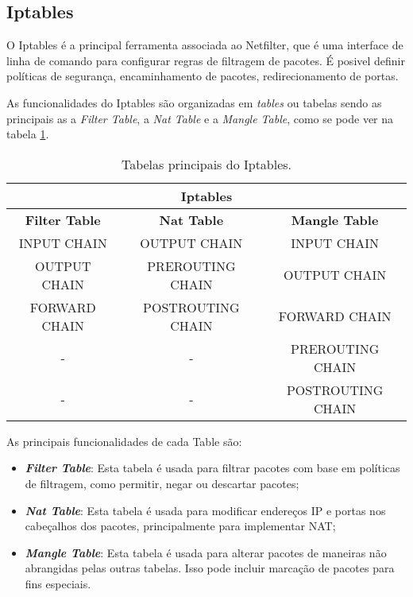 \subsection{Iptables}

O Iptables é a principal ferramenta associada ao Netfilter, que é uma interface
de linha de comando para configurar regras de filtragem de pacotes.
É posivel definir políticas de segurança, encaminhamento de pacotes,
redirecionamento de portas. 

As funcionalidades do Iptables são organizadas em \textit{tables} ou tabelas
sendo as principais as a \textit{Filter Table}, a \textit{Nat Table} e a
\textit{Mangle Table}, como se pode ver na tabela \ref{ipt1}.

\begin{table}[h]
\centering
\begin{tabular}{|c|c|c|}
\hline
\multicolumn{3}{|c|}{Iptables}\\
\hline
\rowcolor{yellow!50}\textbf{Filter Table} & \textbf{Nat Table} & \textbf{Mangle Table}\\
\hline
INPUT CHAIN & OUTPUT CHAIN & INPUT CHAIN\\
\hline
OUTPUT CHAIN & PREROUTING CHAIN & OUTPUT CHAIN\\
\hline
FORWARD CHAIN & POSTROUTING CHAIN & FORWARD CHAIN\\
\hline
- & - & PREROUTING CHAIN\\
\hline
- & - & POSTROUTING CHAIN\\
\hline
\end{tabular}
\caption{Tabelas principais do Iptables.}
\label{ipt1}
\end{table}


As principais funcionalidades de cada Table são:

\begin{itemize}
\item \textbf{\textit{Filter Table}}: Esta tabela é usada para filtrar pacotes com base em 
políticas de filtragem, como permitir, negar ou descartar pacotes;
\item \textbf{\textit{Nat Table}}: Esta tabela é usada para modificar endereços IP e portas
nos cabeçalhos dos pacotes, principalmente para implementar NAT;
\item \textbf{\textit{Mangle Table}}: Esta tabela é usada para alterar pacotes de maneiras
não abrangidas pelas outras tabelas. Isso pode incluir marcação de pacotes para fins especiais.
\end{itemize}



